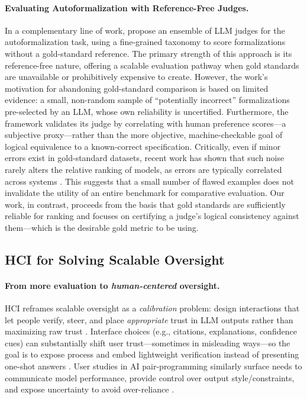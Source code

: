 \documentclass{article}
\begin{document}
\paragraph{Evaluating Autoformalization with Reference-Free Judges.}
In a complementary line of work, \citet{zhang2025goldstandardsepistemicensemble} propose an ensemble of LLM judges for the autoformalization task, using a fine-grained taxonomy to score formalizations without a gold-standard reference.
The primary strength of this approach is its reference-free nature, offering a scalable evaluation pathway when gold standards are unavailable or prohibitively expensive to create.
However, the work's motivation for abandoning gold-standard comparison is based on limited evidence: a small, non-random sample of ``potentially incorrect'' formalizations pre-selected by an LLM, whose own reliability is uncertified.
Furthermore, the framework validates its judge by correlating with human preference scores---a subjective proxy---rather than the more objective, machine-checkable goal of logical equivalence to a known-correct specification.
Critically, even if minor errors exist in gold-standard datasets, recent work has shown that such noise rarely alters the relative ranking of models, as errors are typically correlated across systems \citep{salaudeen2024imagenot}.
This suggests that a small number of flawed examples does not invalidate the utility of an entire benchmark for comparative evaluation.
Our work, in contrast, proceeds from the basis that gold standards are sufficiently reliable for ranking and focuses on certifying a judge's logical consistency against them---which is the desirable gold metric to be using.

\subsection{HCI for Solving Scalable Oversight}

\paragraph{From more evaluation to \emph{human-centered} oversight.}
HCI reframes scalable oversight as a \emph{calibration} problem: design interactions that let people verify, steer, and place \emph{appropriate} trust in LLM outputs rather than maximizing raw trust \citep{bach2022trusthci}. Interface choices (e.g., citations, explanations, confidence cues) can substantially shift user trust---sometimes in misleading ways---so the goal is to expose process and embed lightweight verification instead of presenting one-shot answers \citep{ding2025citations}. User studies in AI pair-programming similarly surface needs to communicate model performance, provide control over output style/constraints, and expose uncertainty to avoid over-reliance \citep{wang2024trustcode}.
\end{document}
